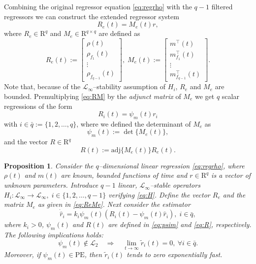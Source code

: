 \documentclass[journal, onecolumn]{IEEEtran}
\newtheorem{prop}{Proposition}
\newcommand{\rea}{\mathrm{R}}
\begin{document}
Combining the original regressor equation \eqref{eq:regrho} with the $q-1$ filtered regressors we can construct the extended regressor system
\begin{equation} \label{eq:RM}
	R_e(t) = M_e(t) r,
\end{equation}
where $R_e \in \rea^q$ and $M_e \in \rea^{q \times q}$ are defined as
\begin{equation} \label{eq:ReMe}
	R_e(t):=	\begin{bmatrix} \rho(t) \\ \rho_{f_1}(t) \\ \vdots \\ \rho_{f_{q-1}}(t) \end{bmatrix},
\;
M_e(t):=\begin{bmatrix} m^\top(t) \\ m^\top_{f_1}(t) \\ \vdots \\ m^\top_{f_{q-1}}(t) \end{bmatrix}.
\end{equation}
Note that, because of the $\mathcal{L}_\infty$--stability assumption of $H_i$, $R_e$ and $M_e$ are bounded. Premultiplying \eqref{eq:RM} by the {\em adjunct matrix} of $M_e$ we get $q$ scalar regressions of the form 
\begin{equation} \label{eq:Rscalar}
	R_i(t) = \psi_m(t) r_i
\end{equation}
with $i \in \bar q:= \{1,2,\dots,q\}$, where we defined the determinant of $M_e$ as
\begin{equation} \label{eq:psim}
\psi_m(t):=\det \{M_e(t)\},
\end{equation}
and the vector $R \in \rea^q$
\begin{equation} \label{eq:R}
	R(t) := \mathrm{adj}\{M_e(t)\} R_e(t).
\end{equation}

\begin{prop} \label{prop:DREM}
Consider the $q$--dimensional linear regression \eqref{eq:regrho}, where $\rho(t)$ and $m(t)$ are known, bounded functions of time and $r \in \rea^q$ is a vector of unknown parameters. Introduce  $q-1$ linear, $\mathcal{L}_\infty$--stable operators $H_i: \mathcal{L}_\infty \to \mathcal{L}_\infty,\;i \in \{1,2,\dots,q-1\}$ verifying \eqref{eq:H}. Define the vector $R_e$ and the matrix $M_e$ as given in \eqref{eq:ReMe}. 
Next consider the estimator
\begin{equation}
	\dot{\hat{r}}_i = k_i \psi_m(t) (R_i(t) - \psi_m(t) \hat{r}_i) ,\;i \in \bar q,
\end{equation}
where $k_i>0$, $\psi_m(t)$ and $R(t)$ are defined in \eqref{eq:psim} and \eqref{eq:R}, respectively. The following implications holds:
\begin{equation} \label{eq:notL2}
	\psi_m(t) \notin \mathcal{L}_2\quad \Longrightarrow \quad \lim_{t\to \infty} \tilde r_i(t)=0, \ \forall i\in\bar{q}.
\end{equation}
Moreover, if $\psi_m(t) \in \mbox{PE}$, then $\tilde r_i(t)$ tends to zero exponentially fast. \end{prop}
\end{document}
